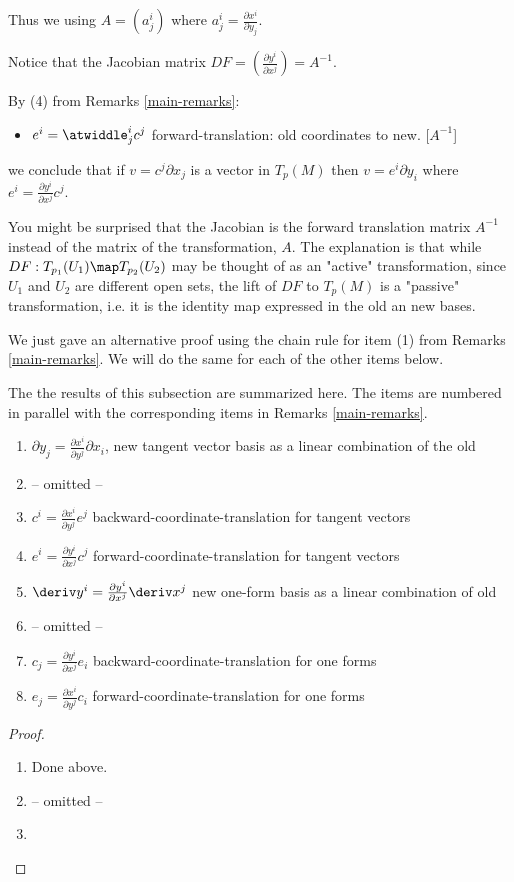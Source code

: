 \documentclass[oneside,12pt]{amsart}
\begin{document}
Thus we using $A = (a^i_j)$ where $a^i_j = \frac{\partial x^i}{\partial y_j}$.

Notice that the Jacobian matrix $DF = (\frac{\partial y^i}{\partial x^j}) = A^{-1}$.

By (4) from Remarks \ref{main-remarks}:
\begin{itemize}
\item $e^i = \atwiddle^i_j c^j$ forward-translation: old coordinates to new. [$A^{-1}$]
\end{itemize}

we conclude that if $v = c^j \partial x_j$ is a vector in $T_p(M)$ then
$v = e^i \partial y_i$ where $e^i = \frac{\partial y^i}{\partial x^j} c^j$.

You might be surprised that the Jacobian is the forward translation matrix $A^{-1}$ instead of the matrix of
the transformation, $A$. The explanation is that while $DF:T_{p_1}(U_1) \map T_{p_2}(U_2)$ may be thought of as an "active"
transformation, since $U_1$ and $U_2$ are different open sets, 
the lift of $DF$ to $T_p(M)$ is a "passive" transformation, i.e. it is the identity map expressed in the old an new bases.

We just gave an alternative proof using the chain rule for item (1) from Remarks \ref{main-remarks}.
We will do the same for each of the other items below.

\begin{remarks}
The the results of this subsection are summarized here. The items are numbered in parallel with
the corresponding items in Remarks \ref{main-remarks}.
\begin{enumerate}
\item $\partial y_j = \frac{\partial x^i}{\partial y^j} \partial x_i$, new tangent vector basis as a linear combination of the old
\item -- omitted --
\item $c^i = \frac{\partial x^i}{\partial y^j} e^j$ backward-coordinate-translation for tangent vectors
\item $e^i = \frac{\partial y^i}{\partial x^j} c^j$ forward-coordinate-translation for tangent vectors
\item $\deriv y^i = \frac{\partial y^i}{\partial x^j} \deriv x^j$ new one-form basis as a linear combination of old
\item -- omitted --
\item $c_j = \frac{\partial y^i}{\partial x^j} e_i$ backward-coordinate-translation for one forms
\item $e_j = \frac{\partial x^i}{\partial y^j} c_i$ forward-coordinate-translation for one forms
\end{enumerate}
\end{remarks}

\begin{proof}
\begin{enumerate}
\item Done above.
\item -- omitted --
\item
\end{enumerate}
\end{proof}


 



\end{document}
